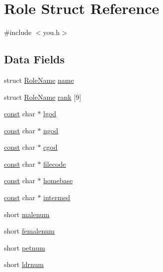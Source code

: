 \hypertarget{structRole}{\section{Role Struct Reference}
\label{structRole}
}


{\ttfamily \#include $<$you.\+h$>$}

\subsection*{Data Fields}
\begin{DoxyCompactItemize}
\item 
struct \hyperlink{structRoleName}{Role\+Name} \hyperlink{structRole_aca88aa13366db080d9a996e0c8a6c767}{name}
\item 
struct \hyperlink{structRoleName}{Role\+Name} \hyperlink{structRole_a77d60a3978eff3814dc2403dbf15c38d}{rank} \mbox{[}9\mbox{]}
\item 
\hyperlink{tradstdc_8h_a2c212835823e3c54a8ab6d95c652660e}{const} char $\ast$ \hyperlink{structRole_a71dfd97228277634b596856f4732e74b}{lgod}
\item 
\hyperlink{tradstdc_8h_a2c212835823e3c54a8ab6d95c652660e}{const} char $\ast$ \hyperlink{structRole_aa4c0b03524de8f7c7efcaa301b8badbb}{ngod}
\item 
\hyperlink{tradstdc_8h_a2c212835823e3c54a8ab6d95c652660e}{const} char $\ast$ \hyperlink{structRole_a72dc55eac27db8d205b94bcb35c708fd}{cgod}
\item 
\hyperlink{tradstdc_8h_a2c212835823e3c54a8ab6d95c652660e}{const} char $\ast$ \hyperlink{structRole_a34fefa6544afd2b36d6deeb9b6fa054f}{filecode}
\item 
\hyperlink{tradstdc_8h_a2c212835823e3c54a8ab6d95c652660e}{const} char $\ast$ \hyperlink{structRole_ace7a79e835912cd60155902cdef2f00c}{homebase}
\item 
\hyperlink{tradstdc_8h_a2c212835823e3c54a8ab6d95c652660e}{const} char $\ast$ \hyperlink{structRole_a25659d9956087171d17d31d3df5366b3}{intermed}
\item 
short \hyperlink{structRole_aa88f771ec189bdfc9d50fd7e9a9800df}{malenum}
\item 
short \hyperlink{structRole_a3df6c34453ea826bb3bad15d174765d1}{femalenum}
\item 
short \hyperlink{structRole_a86f1281a23bc3c6041ace438855bbb8d}{petnum}
\item 
short \hyperlink{structRole_a0540f9522a3678aa359d4d84ad7c9f28}{ldrnum}
\item 

\end{DoxyCompactItemize}
